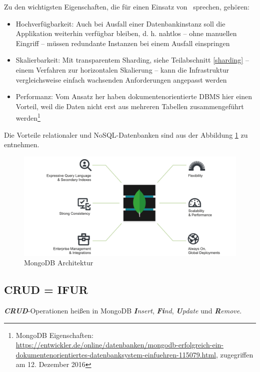 Zu den wichtigsten Eigenschaften, die für einen Einsatz von \mongo\ sprechen, gehören:
\begin{itemize}
\item Hochverfügbarkeit: Auch bei Ausfall einer Datenbankinstanz soll die Applikation weiterhin verfügbar bleiben, d. h. nahtlos – ohne manuellen Eingriff – müssen redundante Instanzen bei einem Ausfall einspringen
\item Skalierbarkeit: Mit transparentem Sharding, siehe Teilabschnitt \ref{sharding} – einem Verfahren zur horizontalen Skalierung – kann die Infrastruktur vergleichsweise einfach wachsenden Anforderungen angepasst werden
\item Performanz: Vom Ansatz her haben dokumentenorientierte DBMS hier einen Vorteil, weil die Daten nicht erst aus mehreren Tabellen zusammengeführt werden\footnote{MongoDB Eigenschaften: \url{https://entwickler.de/online/datenbanken/mongodb-erfolgreich-ein-dokumentenorientiertes-datenbanksystem-einfuehren-115079.html}, zugegriffen am 12. Dezember 2016}
\end{itemize}

Die Vorteile relationaler und NoSQL-Datenbanken sind aus der Abbildung \ref{img:architektur} zu entnehmen.
\begin{figure}[H]
\centering
\includegraphics[width=1.0\textwidth]{resources/architecture}
\caption[MongoDB Architektur]{MongoDB Architektur\protect\footnotemark}
\label{img:architektur}
\end{figure}

\subsection{CRUD = IFUR}\label{ifur}
\textit{\textbf{CRUD}}-Operationen heißen in MongoDB \textit{\textbf{I}nsert}, \textit{\textbf{Fi}nd}, \textit{\textbf{U}pdate} und \textit{\textbf{R}emove}.

